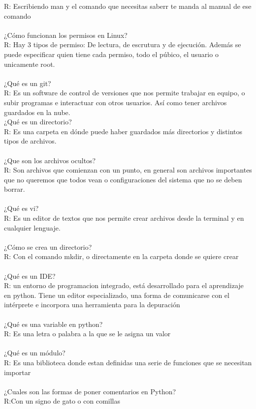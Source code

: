 \documentclass [letterpaper, 12 pts, oneside]{article}
\begin{document}
	R: Escribiendo man y el comando que necesitas saberr te manda al manual de ese comando\\
	\\
	¿Cómo funcionan los permisos en Linux?\\
	R: Hay 3 tipos de permiso: De lectura, de escrutura y de ejecución. Además se puede especificar quien tiene cada permiso, todo el púbico, el usuario o unicamente root.\\
	\\ 
	¿Qué es un git?\\
	R: Es un software de control de versiones que nos permite trabajar en equipo, o subir programas e interactuar con otros usuarios. Así como tener archivos guardados en la nube.
	\\
	¿Qué es un directorio?\\
	R: Es una carpeta en dónde puede haber guardados más directorios y distintos tipos de archivos.\\
	\\
	¿Que son los archivos ocultos?\\
	R: Son archivos que comienzan con un punto, en general son archivos importantes que no queremos que todos vean o configuraciones del sistema que no se deben borrar.\\
	\\
	¿Qué es vi?\\
	R: Es un editor de textos que nos permite crear archivos desde la terminal y en cualquier lenguaje.\\
	\\
	¿Cómo se crea un directorio?\\
	R: Con el comando mkdir, o directamente en la carpeta donde se quiere crear\\
	\\
	¿Qué es un IDE?\\
	R: un entorno de programacion integrado, está desarrollado para el aprendizaje en python. Tiene un editor especializado, una forma de comunicarse con el intérprete e incorpora una herramienta para la depuración \\
	\\
	¿Qué es una variable en python?\\
	R: Es una letra o palabra a la que se le asigna un valor\\
	\\
	¿Qué es un módulo?\\
	R: Es una biblioteca donde estan definidas una serie de funciones que se necesitan importar \\
	\\
	¿Cuales son las formas de poner comentarios en Python?\\
	R:Con un signo de gato o con comillas\\
	\\
\end{document}

